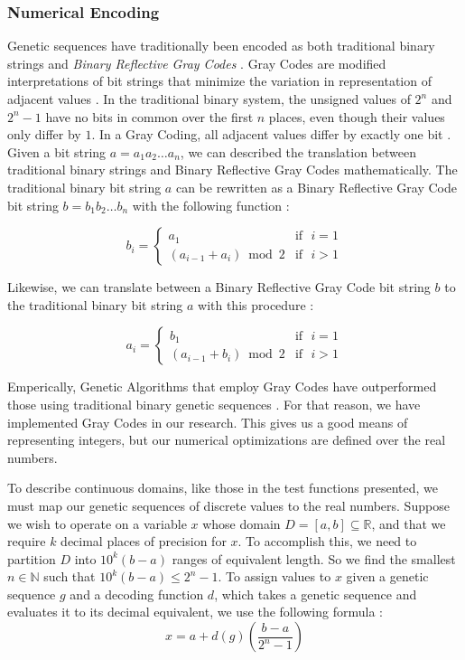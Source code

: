  \subsubsection*{Numerical Encoding}
Genetic sequences have traditionally been encoded as both traditional binary strings and \emph{Binary Reflective Gray Codes} \cite{Whitley97}. Gray Codes are modified interpretations of bit strings that minimize the variation in representation of adjacent values \cite{Back93}. In the traditional binary system, the unsigned values of $2^n$ and $2^n - 1$ have no bits in common over the first $n$ places, even though their values only differ by $1$. In a Gray Coding, all adjacent values differ by exactly one bit \cite{Michalewicz98}. Given a bit string $a = a_1 a_2 \ldots a_n$, we can described the translation between traditional binary strings and Binary Reflective Gray Codes mathematically. The traditional binary bit string $a$ can be rewritten as a Binary Reflective Gray Code bit string $b =  b_1 b_2 \ldots b_n$ with the following function \cite{Back93}:

\begin{displaymath}
   b_i = \left\{
     \begin{array}{cr}
       a_1 & \text{if~ } i = 1 \\
       (a_{i-1} + a_i) \bmod{2} & \text{if~ } i > 1
     \end{array}
   \right.
\end{displaymath} 

Likewise, we can translate between a Binary Reflective Gray Code bit string $b$ to the traditional binary bit string $a$ with this procedure \cite{Back93}:

\begin{displaymath}
   a_i = \left\{
     \begin{array}{cr}
       b_1 & \text{if~ } i = 1 \\
       (a_{i-1} + b_i) \bmod{2} & \text{if~ } i > 1
     \end{array}
   \right.
\end{displaymath} 

Emperically, Genetic Algorithms that employ Gray Codes have outperformed those using traditional binary genetic sequences \cite{Back93}. For that reason, we have implemented Gray Codes in our research. This gives us a good means of representing integers, but our numerical optimizations are defined over the real numbers.

To describe continuous domains, like those in the test functions presented, we must map our genetic sequences of discrete values to the real numbers. Suppose we wish to operate on a variable $x$ whose domain $D = [a,b] \subseteq \mathbb{R}$, and that we require $k$ decimal places of precision for $x$. To accomplish this, we need to partition $D$ into $10^k(b - a)$ ranges of equivalent length. So we find the smallest $n \in \mathbb{N}$ such that $10^k(b - a) \leq 2^n - 1$. To assign values to $x$ given a genetic sequence $g$ and a decoding function $d$, which takes a genetic sequence and evaluates it to its decimal equivalent, we use the following formula \cite{Michalewicz98}:
\[ x = a + d(g) \left( \frac{b-a}{2^n - 1} \right) \]

